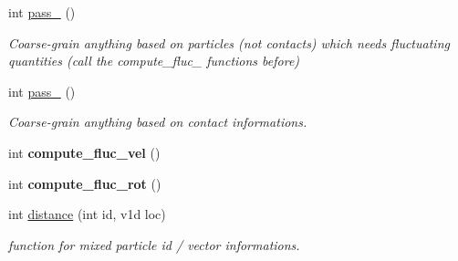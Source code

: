 \begin{DoxyCompactItemize}
\mbox{\label{classCoarsing_a0556e88442645cf2def6f9ce918b9bb3}} 
int \hyperlink{classCoarsing_a0556e88442645cf2def6f9ce918b9bb3}{pass\+\_} ()
\begin{DoxyCompactList}\small\item\em Coarse-\/grain anything based on particles (not contacts) which needs fluctuating quantities (call the compute\+\_\+fluc\+\_\+ functions before) \end{DoxyCompactList}\item 
\mbox{\label{classCoarsing_ac2ae89b569d5d21ff2f54798021d366a}} 
int \hyperlink{classCoarsing_ac2ae89b569d5d21ff2f54798021d366a}{pass\+\_} ()
\begin{DoxyCompactList}\small\item\em Coarse-\/grain anything based on contact informations. \end{DoxyCompactList}\item 
\mbox{\label{classCoarsing_ab5c674784326a7be061683edc160753a}} 
int {\bfseries compute\+\_\+fluc\+\_\+vel} ()
\item 
\mbox{\label{classCoarsing_a2fa1d870e2b81306b5cc67886b35d928}} 
int {\bfseries compute\+\_\+fluc\+\_\+rot} ()
\item 
\mbox{\label{classCoarsing_accc475e5888ec7a03a26b2354716a41d}} 
int \hyperlink{classCoarsing_accc475e5888ec7a03a26b2354716a41d}{distance} (int id, v1d loc)
\begin{DoxyCompactList}\small\item\em function for mixed particle id / vector informations. \end{DoxyCompactList}\end{DoxyCompactItemize}
